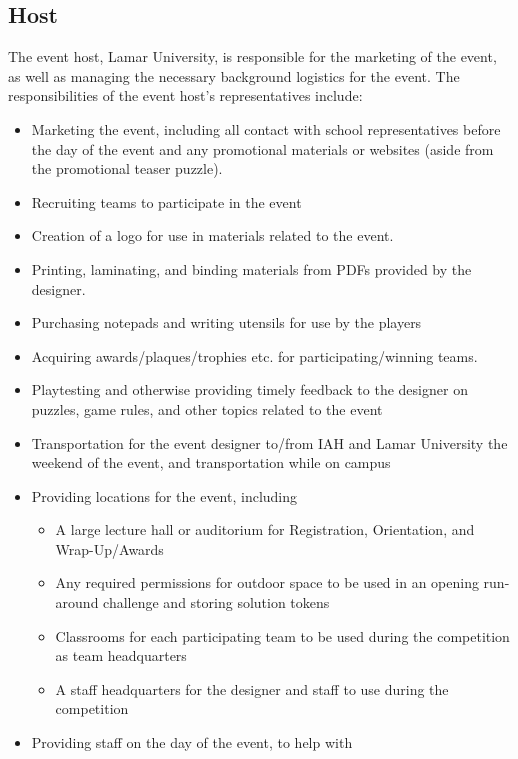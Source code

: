 \documentclass[11pt,letterpaper]{article}
\begin{document}
\subsection{Host}

The event host, Lamar University, is responsible for the marketing of the
event, as well as managing the necessary background logistics for the event.
The responsibilities of the event host's representatives include:

\begin{itemize}
  \item Marketing the event, including all contact with school
        representatives before the day of the event and any promotional
        materials or websites (aside from the promotional teaser puzzle).
  \item Recruiting teams to participate in the event
  \item Creation of a logo for use in materials related to the event.
  \item Printing, laminating, and binding materials from PDFs provided by the 
        designer.
  \item Purchasing notepads and writing utensils for use by the players
  \item Acquiring awards/plaques/trophies etc. for participating/winning teams.
  \item Playtesting and otherwise providing timely feedback to the designer on
        puzzles, game rules, and other topics related to the event
  \item Transportation for the event designer to/from IAH and Lamar University
        the weekend of the event, and transportation while on campus
  \item Providing locations for the event, including
    \begin{itemize}
      \item A large lecture hall or auditorium for Registration, Orientation,
            and Wrap-Up/Awards
      \item Any required permissions for outdoor space to be used in an opening 
            run-around challenge and storing solution tokens
      \item Classrooms for each participating team to be used during the
            competition as team headquarters
      \item A staff headquarters for the designer and staff to use during
            the competition
    \end{itemize}
  \item Providing staff on the day of the event, to help with

\end{itemize}
\end{document}
